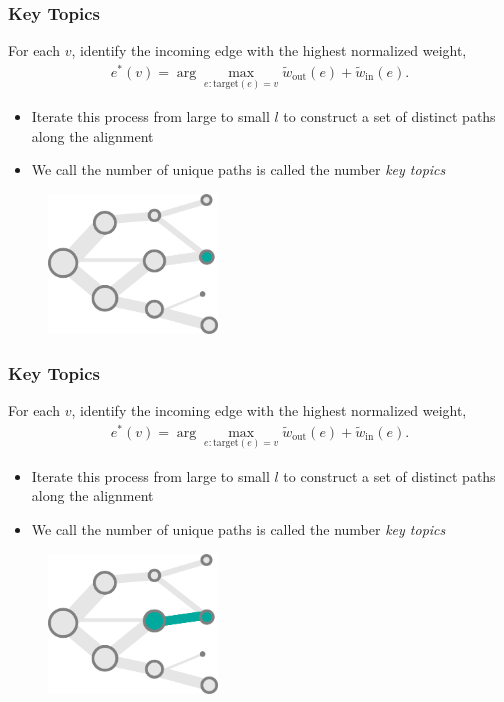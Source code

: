 \documentclass[hyperref={colorlinks=true, linkcolor=violet, citecolor=SeaGreen}]{beamer}
\begin{document}
\begin{frame}
  \frametitle{Key Topics}
  For each $v$, identify the incoming edge with the highest normalized weight,
  \begin{align*}
    e^\ast\left(v\right) = \arg \max_{e : \text{target}\left(e\right) = v} \tilde{w}_{\text{out}}\left(e\right) + \tilde{w}_{\text{in}}\left(e\right).
  \end{align*}
  \begin{itemize}
    \item Iterate this process from large to small $l$ to construct a set of
    distinct  paths along the alignment
    \item We call the number of unique paths is called the number \emph{key topics}
  \end{itemize}

\begin{figure}
\includegraphics[width=0.4\textwidth]{branch_construction-1}
\end{figure}
\end{frame}

\begin{frame}
  \frametitle{Key Topics}
  For each $v$, identify the incoming edge with the highest normalized weight,
  \begin{align*}
    e^\ast\left(v\right) = \arg \max_{e : \text{target}\left(e\right) = v} \tilde{w}_{\text{out}}\left(e\right) + \tilde{w}_{\text{in}}\left(e\right).
  \end{align*}
  \begin{itemize}
    \item Iterate this process from large to small $l$ to construct a set of
    distinct paths along the alignment
    \item We call the number of unique paths is called the number \emph{key
    topics}
  \end{itemize}

\begin{figure}
\includegraphics[width=0.4\textwidth]{branch_construction-3}
\end{figure}
\end{frame}
\end{document}
